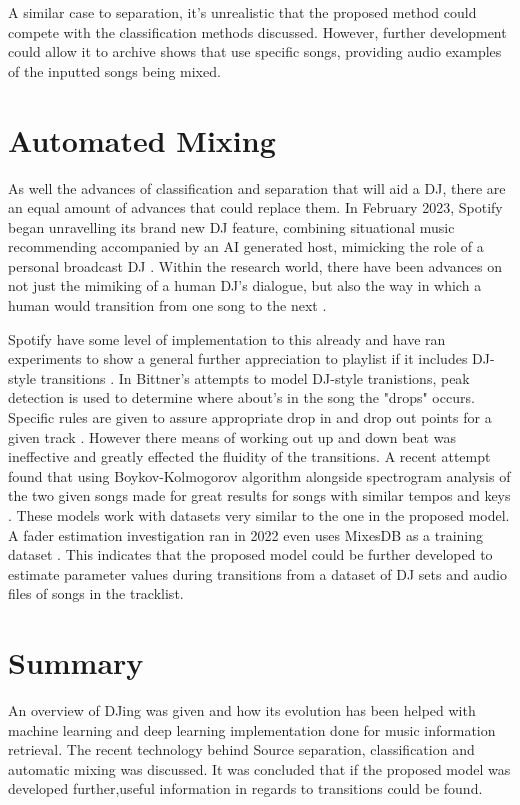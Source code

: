 A similar case to separation, it's unrealistic that the proposed method could compete with the classification methods discussed. However, further development could allow it to archive shows that use specific songs, providing audio examples of the inputted songs being mixed.

\section{Automated Mixing}
As well the advances of classification and separation that will aid a DJ, there are an equal amount of advances that could replace them. In February 2023, Spotify began unravelling its brand new DJ feature, combining situational music recommending accompanied by an AI generated host, mimicking the role of a personal broadcast DJ \citep{naomi_spotify_2023}. Within the research world, there have been advances on not just the mimiking of a human DJ's dialogue, but also the way in which a human would transition from one song to the next \citep{chen_automatic_2022}.

Spotify have some level of implementation to this already and have ran experiments to show a general further appreciation to playlist if it includes DJ-style transitions \citep{bittner_automatic_2017}. In Bittner's  attempts to model DJ-style tranistions, peak detection is used to determine where about's in the song the "drops" occurs. Specific rules are given to assure appropriate drop in and drop out points for a given track \citep{bittner_automatic_2017}.  However there means of working out up and down beat was ineffective and greatly effected the fluidity of the transitions. A recent attempt found that using Boykov-Kolmogorov algorithm alongside spectrogram analysis of the two given songs made for great results for songs with similar tempos and keys \citep{robinson_automated_2023}. These models work with datasets very similar to the one in the proposed model. A fader estimation investigation ran in 2022 even uses MixesDB as a training dataset \citep{kim_joint_2022}. This indicates that the proposed model could be further developed to estimate parameter values during transitions from a dataset of DJ sets and audio files of songs in the tracklist.

\section{Summary}
An overview of DJing was given and how its evolution has been helped with machine learning and deep learning implementation done for music information retrieval. The recent technology behind Source separation, classification and automatic mixing was discussed. It was concluded that if the proposed model was developed further,useful information in regards to transitions could be found.

